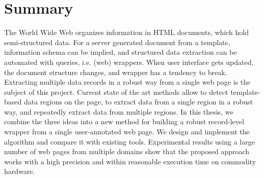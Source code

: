\chapter{Summary}

The World Wide Web organizes information in HTML documents, which hold semi-structured data. For a server generated document from a template, information schema can be implied, and structured data extraction can be automated with queries, i.e. (web) wrappers. When user interface gets updated, the document structure changes, and wrapper has a tendency to break. Extracting multiple data records in a robust way from a single web page is the subject of this project. Current state of the art methods allow to detect template-based data regions on the page, to extract data from a single region in a robust way, and repeatedly extract data from multiple regions. In this thesis, we combine the three ideas into a new method for building a robust record-level wrapper from a single user-annotated web page. We design and implement the algorithm and compare it with existing tools. Experimental results using a large number of web pages from multiple domains show that the proposed approach works with a high precision and within reasonable execution time on commodity hardware.

